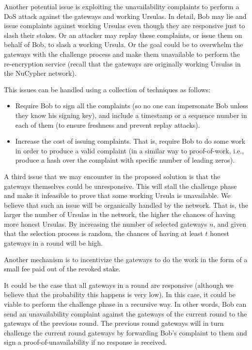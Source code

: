 Another potential issue is exploiting the unavailability complaints to perform a DoS attack against the gateways and working Ursulas. In detail, Bob may lie and issue complaints against working Ursulas even though they are responsive just to slash their stakes. Or an attacker may replay these complaints, or issue them on behalf of Bob, to slash a working Ursula. Or the goal could be to overwhelm the gateways with the challenge process and make them unavailable to perform the re-encryption service (recall that the gateways are originally working Ursulas in the NuCypher network).


This issues can be handled using a collection of techniques as follows:
\begin{itemize}
\item Require Bob to sign all the complaints (so no one can impersonate Bob unless they know his signing key), and include a timestamp or a sequence number in each of them (to ensure freshness and prevent replay attacks).

\item Increase the cost of issuing complaints. That is, require Bob to do some work in order to produce a valid complaint (in a similar way to proof-of-work, i.e., produce a hash over the complaint with specific number of leading zeros).
\end{itemize}


A third issue that we may encounter in the proposed solution is that the gateways themselves could be unresponsive. This will stall the challenge phase and make it infeasible to prove that some working Ursula is unavailable. We believe that such an issue will be organically handled by the network. That is, the larger the number of Ursulas in the network, the higher the chances of having more honest Ursulas. By increasing the number of selected gateways $n$, and given that the selection process is random, the chances of having at least $t$ honest gateways in a round will be high.


Another mechanism is to incentivize the gateways to do the work in the form of a small fee paid out of the revoked stake.


It could be the case that all gateways in a round are responsive (although we believe that the probability this happens is very low). In this case, it could be viable to perform the challenge phase in a recursive way. In other words, Bob can send an unavailability complaint against the gateways of the current round to the gateways of the previous round. The previous round gateways will in turn challenge the current round gateways by forwarding Bob's complaint to them and sign a proof-of-unavailability if no response is received. 

